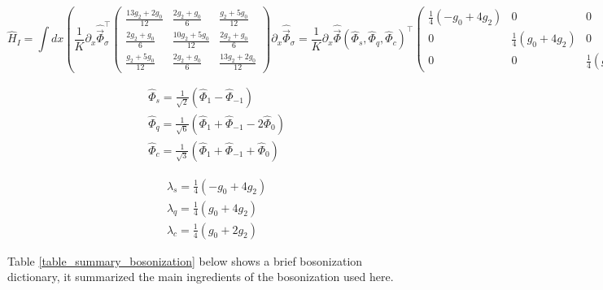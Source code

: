 \begin{equation}
    \hat{H}_{I} = \int dx \left( \frac{1}{K} \partial_{x}\hat{\vec{\Phi}}_{\sigma}^\top
                    \begin{pmatrix}
                    \frac{13 g_2 + 2 g_0}{12} & \frac{2g_2 + g_0}{6} & \frac{g_2+5g_0}{12} \\
                    \frac{2g_2 + g_0}{6} & \frac{10g_2 + 5 g_0}{12} & \frac{2g_2 + g_0}{6} \\
                    \frac{g_2+5g_0}{12}& \frac{2g_2 + g_0}{6}& \frac{13 g_2 + 2 g_0}{12} 
            \end{pmatrix}  \partial_{x}\hat{\vec{\Phi}}_\sigma =
             \frac{1}{K} \partial_{x}\hat{\vec{\Phi}} (\hat{\Phi}_{s},\hat{\Phi}_{q},\hat{\Phi}_{c})^\top
                    \begin{pmatrix}
                    \frac{1}{4}\left(-g_{0}+4g_{2}\right)  & 0 & 0 \\
                    0 & \frac{1}{4}\left(g_{0}+4g_{2}\right)  & 0\\
                    0& 0& \frac{1}{4}\left( g_{0}+2g_{2}\right)
            \end{pmatrix}  \partial_{x}\hat{\vec{\Phi}}(\hat{\Phi}_{s},\hat{\Phi}_{q},\hat{\Phi}_{c}) \right)
\end{equation}


\begin{align*}
& \hat{\Phi}_{s}=\frac{1}{\sqrt{2}}\left(\hat{\Phi}_{1}-\hat{\Phi}_{-1}\right) \\
& \hat{\Phi}_{q}=\frac{1}{\sqrt{6}}\left(\hat{\Phi}_{1}+\hat{\Phi}_{-1}-2 \hat{\Phi}_{0}\right)  \\
& \hat{\Phi}_{c}=\frac{1}{\sqrt{3}}\left(\hat{\Phi}_{1}+\hat{\Phi}_{-1}+\hat{\Phi}_{0}\right)
\end{align*}



\begin{align*}
& \lambda_{s}=\frac{1}{4}\left(-g_{0}+4g_{2}\right) \\
& \lambda_{q}=\frac{1}{4}\left(g_{0}+4g_{2}\right)  \\
& \lambda_{c}=\frac{1}{4}\left( g_{0}+2g_{2}\right)
\end{align*}





\newpage

Table \ref{table_summary_bosonization} below shows a brief bosonization dictionary, it summarized the main ingredients of the bosonization used here.

